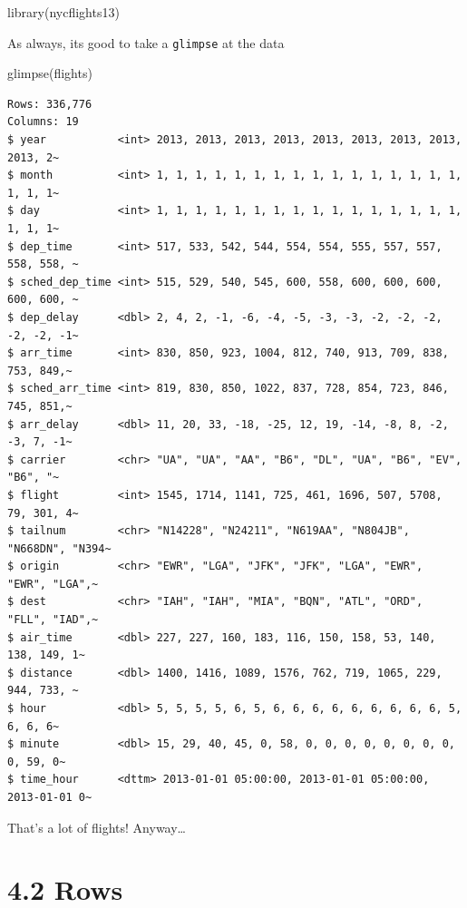 \documentclass[
  letterpaper,
  DIV=11,
  numbers=noendperiod]{scrreprt}
\newenvironment{Shaded}{\begin{snugshade}}{\end{snugshade}}
\newcommand{\FunctionTok}[1]{\textcolor[rgb]{0.28,0.35,0.67}{#1}}
\newcommand{\NormalTok}[1]{\textcolor[rgb]{0.00,0.23,0.31}{#1}}
\begin{document}
\begin{Shaded}
\begin{Highlighting}[]
\FunctionTok{library}\NormalTok{(nycflights13)}
\end{Highlighting}
\end{Shaded}

As always, its good to take a \texttt{glimpse} at the data

\begin{Shaded}
\begin{Highlighting}[]
\FunctionTok{glimpse}\NormalTok{(flights)}
\end{Highlighting}
\end{Shaded}

\begin{verbatim}
Rows: 336,776
Columns: 19
$ year           <int> 2013, 2013, 2013, 2013, 2013, 2013, 2013, 2013, 2013, 2~
$ month          <int> 1, 1, 1, 1, 1, 1, 1, 1, 1, 1, 1, 1, 1, 1, 1, 1, 1, 1, 1~
$ day            <int> 1, 1, 1, 1, 1, 1, 1, 1, 1, 1, 1, 1, 1, 1, 1, 1, 1, 1, 1~
$ dep_time       <int> 517, 533, 542, 544, 554, 554, 555, 557, 557, 558, 558, ~
$ sched_dep_time <int> 515, 529, 540, 545, 600, 558, 600, 600, 600, 600, 600, ~
$ dep_delay      <dbl> 2, 4, 2, -1, -6, -4, -5, -3, -3, -2, -2, -2, -2, -2, -1~
$ arr_time       <int> 830, 850, 923, 1004, 812, 740, 913, 709, 838, 753, 849,~
$ sched_arr_time <int> 819, 830, 850, 1022, 837, 728, 854, 723, 846, 745, 851,~
$ arr_delay      <dbl> 11, 20, 33, -18, -25, 12, 19, -14, -8, 8, -2, -3, 7, -1~
$ carrier        <chr> "UA", "UA", "AA", "B6", "DL", "UA", "B6", "EV", "B6", "~
$ flight         <int> 1545, 1714, 1141, 725, 461, 1696, 507, 5708, 79, 301, 4~
$ tailnum        <chr> "N14228", "N24211", "N619AA", "N804JB", "N668DN", "N394~
$ origin         <chr> "EWR", "LGA", "JFK", "JFK", "LGA", "EWR", "EWR", "LGA",~
$ dest           <chr> "IAH", "IAH", "MIA", "BQN", "ATL", "ORD", "FLL", "IAD",~
$ air_time       <dbl> 227, 227, 160, 183, 116, 150, 158, 53, 140, 138, 149, 1~
$ distance       <dbl> 1400, 1416, 1089, 1576, 762, 719, 1065, 229, 944, 733, ~
$ hour           <dbl> 5, 5, 5, 5, 6, 5, 6, 6, 6, 6, 6, 6, 6, 6, 6, 5, 6, 6, 6~
$ minute         <dbl> 15, 29, 40, 45, 0, 58, 0, 0, 0, 0, 0, 0, 0, 0, 0, 59, 0~
$ time_hour      <dttm> 2013-01-01 05:00:00, 2013-01-01 05:00:00, 2013-01-01 0~
\end{verbatim}

That's a lot of flights! Anyway\ldots{}

\section{4.2 Rows}\label{rows}
\end{document}
